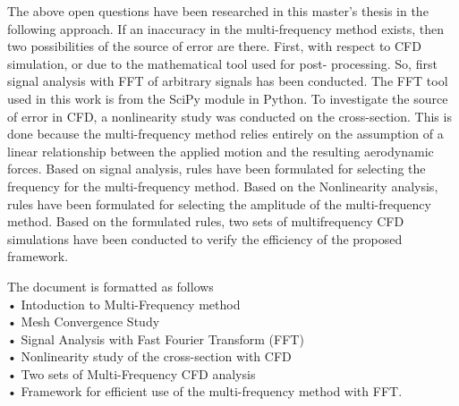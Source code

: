 \documentclass[../main]{subfiles}
\begin{document}
The above open questions have been researched in this master's thesis in the following approach. 
If an inaccuracy in the multi-frequency method exists, then two possibilities of the source of error 
are there. First, with respect to CFD simulation, or due to the mathematical tool used for post-
processing. So, first signal analysis with FFT of arbitrary signals has been conducted. The FFT tool 
used in this work is from the SciPy module in Python. To investigate the source of error in CFD, a 
nonlinearity study was conducted on the cross-section. This is done because the multi-frequency 
method relies entirely on the assumption of a linear relationship between the applied motion and 
the resulting aerodynamic forces. Based on signal analysis, rules have been formulated for selecting 
the frequency for the multi-frequency method. Based on the Nonlinearity analysis, rules have been 
formulated for selecting the amplitude of the multi-frequency method. Based on the formulated 
rules, two sets of multifrequency CFD simulations have been conducted to verify the efficiency of 
the proposed framework.   
\vspace{0.5 cm}

\begin{flushleft}   
The document is formatted as follows \\
\hspace{2cm}• Intoduction to Multi-Frequency method   \\
\hspace{2cm}• Mesh Convergence Study \\
\hspace{2cm}• Signal Analysis with Fast Fourier Transform (FFT) \\
\hspace{2cm}• Nonlinearity study of the cross-section with CFD  \\
\hspace{2cm}• Two sets of Multi-Frequency CFD analysis  \\
\hspace{2cm}• Framework for efficient use of the multi-frequency method with FFT.  \\
\end{flushleft}
\end{document}
